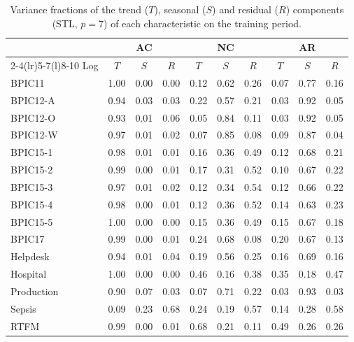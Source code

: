 \begin{table}[t]
\centering
\caption{Variance fractions of the trend ($T$), seasonal ($S$) and residual ($R$) components (STL, $p = 7$) of each characteristic on the training period.}
\label{tab:variance-fractions}
\scriptsize
\setlength{\tabcolsep}{4pt}
\begin{tabular}{@{}l*{3}{ccc}@{}}
\toprule
& \multicolumn{3}{c}{AC} & \multicolumn{3}{c}{NC} & \multicolumn{3}{c}{AR} \\
\cmidrule(lr){2-4}\cmidrule(lr){5-7}\cmidrule(l){8-10}
Log & $T$ & $S$ & $R$ & $T$ & $S$ & $R$ & $T$ & $S$ & $R$ \\
\midrule
BPIC11 & 1.00 & 0.00 & 0.00 & 0.12 & 0.62 & 0.26 & 0.07 & 0.77 & 0.16 \\
BPIC12-A & 0.94 & 0.03 & 0.03 & 0.22 & 0.57 & 0.21 & 0.03 & 0.92 & 0.05 \\
BPIC12-O & 0.93 & 0.01 & 0.06 & 0.05 & 0.84 & 0.11 & 0.03 & 0.92 & 0.05 \\
BPIC12-W & 0.97 & 0.01 & 0.02 & 0.07 & 0.85 & 0.08 & 0.09 & 0.87 & 0.04 \\
BPIC15-1 & 0.98 & 0.01 & 0.01 & 0.16 & 0.36 & 0.49 & 0.12 & 0.68 & 0.21 \\
BPIC15-2 & 0.99 & 0.00 & 0.01 & 0.17 & 0.31 & 0.52 & 0.10 & 0.67 & 0.22 \\
BPIC15-3 & 0.97 & 0.01 & 0.02 & 0.12 & 0.34 & 0.54 & 0.12 & 0.66 & 0.22 \\
BPIC15-4 & 0.98 & 0.00 & 0.01 & 0.12 & 0.36 & 0.52 & 0.14 & 0.63 & 0.23 \\
BPIC15-5 & 1.00 & 0.00 & 0.00 & 0.15 & 0.36 & 0.49 & 0.15 & 0.67 & 0.18 \\
BPIC17 & 0.99 & 0.00 & 0.01 & 0.24 & 0.68 & 0.08 & 0.20 & 0.67 & 0.13 \\
Helpdesk & 0.94 & 0.01 & 0.04 & 0.19 & 0.56 & 0.25 & 0.16 & 0.69 & 0.16 \\
Hospital & 1.00 & 0.00 & 0.00 & 0.46 & 0.16 & 0.38 & 0.35 & 0.18 & 0.47 \\
Production & 0.90 & 0.07 & 0.03 & 0.07 & 0.71 & 0.22 & 0.03 & 0.93 & 0.03 \\
Sepsis & 0.09 & 0.23 & 0.68 & 0.24 & 0.19 & 0.57 & 0.14 & 0.28 & 0.58 \\
RTFM & 0.99 & 0.00 & 0.01 & 0.68 & 0.21 & 0.11 & 0.49 & 0.26 & 0.26 \\
\bottomrule
\end{tabular}
\end{table}
